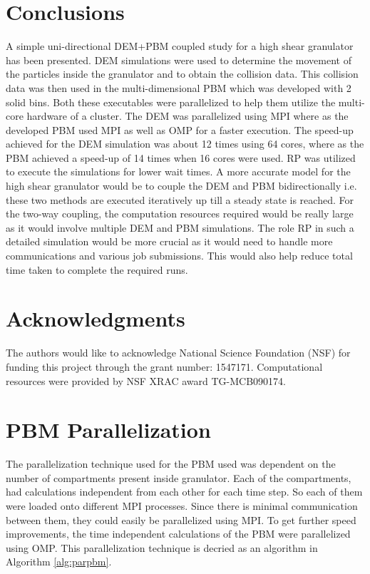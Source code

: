 \documentclass[preprint,11pt,authoryear]{elsarticle}
\begin{document}
\section{Conclusions}
A simple uni-directional DEM+PBM coupled study for a high shear granulator has been 
presented. DEM simulations were used to determine the movement of the particles inside 
the granulator and to obtain the collision data. This collision data was then used in 
the multi-dimensional PBM which was developed with 2 solid bins. Both these executables 
were parallelized to help them utilize the multi-core hardware of a cluster. The DEM 
was parallelized using MPI where as the developed PBM used MPI as well as OMP for a 
faster execution. The speed-up achieved for the DEM simulation was about 12 times using 
64 cores, where as the PBM achieved a speed-up of 14 times when 16 cores were used. 
RP was utilized to execute the simulations for lower wait times. A more accurate 
model for the high shear granulator would be to couple the DEM and PBM bidirectionally 
i.e. these two methods are executed iteratively up till a steady state is reached. 
For the two-way coupling, the computation resources required would be really large 
as it would involve multiple DEM and PBM simulations. The role RP in such a 
detailed simulation would be more crucial as it would need to handle more 
communications and various job submissions. This would also help reduce 
total time taken to complete the required runs.

\section{Acknowledgments}
The authors would like to acknowledge National Science Foundation (NSF) for 
funding this project through the grant number: 1547171. Computational resources 
were provided by NSF XRAC award TG-MCB090174.


\appendix
\section{PBM Parallelization}
\label{app:parallelPBM}
The parallelization technique used for the PBM used was dependent on the number of 
compartments present inside granulator. Each of the compartments, had calculations 
independent from each other for each time step. So each of them were loaded 
onto different MPI processes. Since there is minimal communication between them, 
they could easily be parallelized using MPI. To get further speed improvements, 
the time independent calculations of the PBM were parallelized using OMP. This 
parallelization technique is decried as an algorithm in Algorithm \ref{alg:parpbm}.
\end{document}

